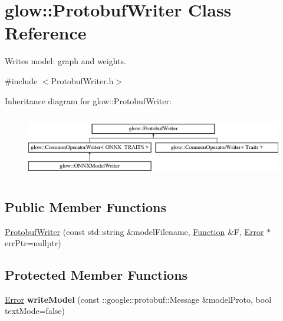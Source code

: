 \hypertarget{classglow_1_1_protobuf_writer}{}\section{glow\+:\+:Protobuf\+Writer Class Reference}
\label{classglow_1_1_protobuf_writer}


Writes model\+: graph and weights.  




{\ttfamily \#include $<$Protobuf\+Writer.\+h$>$}

Inheritance diagram for glow\+:\+:Protobuf\+Writer\+:\begin{figure}[H]
\begin{center}
\leavevmode
\includegraphics[height=2.847458cm]{classglow_1_1_protobuf_writer}
\end{center}
\end{figure}
\subsection*{Public Member Functions}
\begin{DoxyCompactItemize}
\item 
\hyperlink{classglow_1_1_protobuf_writer_a4c960b5cc47d4d309c109d2cf9043fd9}{Protobuf\+Writer} (const std\+::string \&model\+Filename, \hyperlink{classglow_1_1_function}{Function} \&F, \hyperlink{namespaceglow_afdb176c3a672ef66db0ecfc19a8d39bf}{Error} $\ast$err\+Ptr=nullptr)
\end{DoxyCompactItemize}
\subsection*{Protected Member Functions}
\begin{DoxyCompactItemize}
\item 
\mbox{\label{classglow_1_1_protobuf_writer_aecac8f4b7fe432f5910f2cd0cb81f74a}} 
\hyperlink{namespaceglow_afdb176c3a672ef66db0ecfc19a8d39bf}{Error} {\bfseries write\+Model} (const \+::google\+::protobuf\+::\+Message \&model\+Proto, bool text\+Mode=false)
\end{DoxyCompactItemize}
